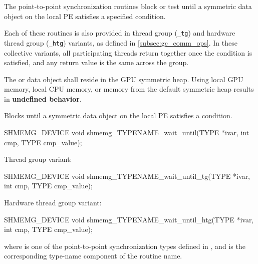 
The point-to-point synchronization routines block or test until a symmetric data
object on the local \ac{PE} satisfies a specified condition.

Each of these routines is also provided in thread group (\texttt{\_tg}) and
hardware thread group (\texttt{\_htg}) variants, as defined in
\cref{subsec:gc_comm_ops}. In these collective variants, all participating
threads return together once the condition is satisfied, and any return value is
the same across the group.

The  or  data object shall reside in the \ac{GPU}
symmetric heap. Using local \ac{GPU} memory, local CPU memory, or memory from the
default symmetric heap results in \textbf{undefined behavior}.

\label{subsec:gc_wait_until}

Blocks until a symmetric data object on the local \ac{PE} satisfies a condition.

\begin{apidefinition}
\begin{Csynopsis}
SHMEMG_DEVICE void shmemg_TYPENAME_wait_until(TYPE *ivar, int cmp,
    TYPE cmp_value);
\end{Csynopsis}

Thread group variant:
\begin{CsynopsisCol}
SHMEMG_DEVICE void shmemg_TYPENAME_wait_until_tg(TYPE *ivar, int cmp,
    TYPE cmp_value);
\end{CsynopsisCol}

Hardware thread group variant:
\begin{CsynopsisCol}
SHMEMG_DEVICE void shmemg_TYPENAME_wait_until_htg(TYPE *ivar, int cmp,
    TYPE cmp_value);
\end{CsynopsisCol}

where \TYPE{} is one of the point-to-point synchronization types defined in
, and \TYPENAME{} is the corresponding type-name component of the
routine name.

\begin{apiarguments}
\end{apiarguments}


\end{apidefinition}


